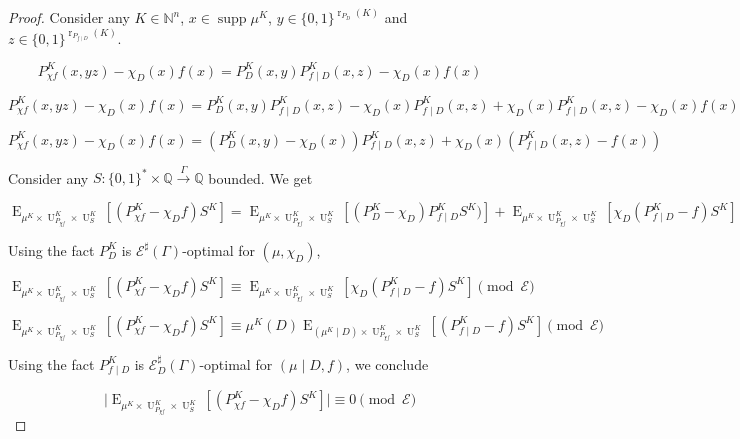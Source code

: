 \documentclass{article}
\numberwithin{equation}{section}
\theoremstyle{definition}
\theoremstyle{plain}
\newcommand{\Bool}{\{0,1\}}
\newcommand{\Words}{{\Bool^*}}
\DeclareMathOperator{\Supp}{supp}
\DeclareMathOperator{\E}{E}
\DeclareMathOperator{\R}{r}
\DeclareMathOperator{\Un}{U}
\newcommand{\Nats}{\mathbb{N}}
\newcommand{\Rats}{\mathbb{Q}}
\newcommand{\Abs}[1]{\lvert #1 \rvert}
\newcommand{\Fall}{\mathcal{E}}
\newcommand{\ESG}{\Fall^\sharp(\Gamma)}
\newcommand{\BoolR}[1]{\Bool^{\R_{#1}(K)}}
\newcommand{\Scheme}{\xrightarrow{\Gamma}}
\begin{document}
\begin{proof}

Consider any $K \in \Nats^n$, $x \in \Supp \mu^{K}$, $y \in \BoolR{P_D}$ and $z \in \BoolR{P_{f \mid D}}$.

\[P_{\chi f}^K(x,yz) - \chi_D(x) f(x) = P_D^K(x,y) P_{f \mid D}^K(x,z) - \chi_D(x) f(x)\]

\[P_{\chi f}^K(x,yz) - \chi_D(x) f(x) = P_D^K(x,y) P_{f \mid D}^K(x,z) - \chi_D(x) P_{f \mid D}^K(x,z) + \chi_D(x) P_{f \mid D}^K(x,z) - \chi_D(x) f(x)\]

\[P_{\chi f}^K(x,yz) - \chi_D(x) f(x) = (P_D^K(x,y) - \chi_D(x)) P_{f \mid D}^K(x,z) + \chi_D(x) (P_{f \mid D}^K(x,z) - f(x))\]

Consider any $S: \Words \times \Rats \Scheme \Rats$ bounded. We get

\[\E_{\mu^{K} \times \Un_{P_{\chi f}}^K \times \Un_S^K}[(P_{\chi f}^K - \chi_D f)S^K] = \E_{\mu^{K} \times \Un_{P_{\chi f}}^K \times \Un_S^K}[(P_D^K - \chi_D) P_{f \mid D}^KS^K)] + \E_{\mu^{K} \times \Un_{P_{\chi f}}^K \times \Un_S^K}[\chi_D (P_{f \mid D}^K - f)S^K]\]

Using the fact $P_D^K$ is $\ESG$-optimal for $(\mu,\chi_D)$,

\[\E_{\mu^{K} \times \Un_{P_{\chi f}}^K \times \Un_S^K}[(P_{\chi f}^K - \chi_D f)S^K] \equiv  \E_{\mu^{K} \times \Un_{P_{\chi f}}^K \times \Un_S^K}[\chi_D (P_{f \mid D}^K - f)S^K] \pmod \Fall\]

\[\E_{\mu^{K} \times \Un_{P_{\chi f}}^K \times \Un_S^K}[(P_{\chi f}^K - \chi_D f)S^K] \equiv \mu^{K}(D)  \E_{(\mu^{K} \mid D) \times \Un_{P_{\chi f}}^K \times \Un_S^K}[(P_{f \mid D}^K - f)S^K] \pmod \Fall\]
 
Using the fact $P_{f \mid D}^K$ is $\Fall_D^\sharp(\Gamma)$-optimal for $(\mu \mid D, f)$, we conclude
 
 \[\Abs{\E_{\mu^{K} \times \Un_{P_{\chi f}}^K \times \Un_S^K}[(P_{\chi f}^K - \chi_D f)S^K]} \equiv 0 \pmod \Fall\]
%
\end{proof}
 
\end{document}
